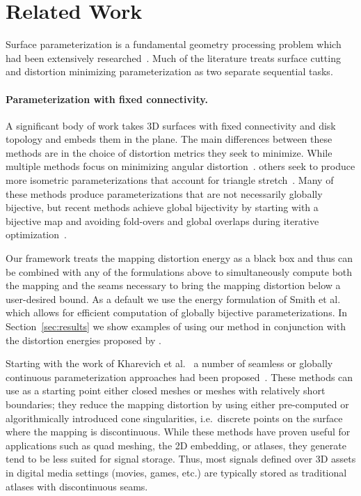 
\section{Related Work}
\label{sec:related}
Surface parameterization is a fundamental geometry processing problem which had been extensively researched~\cite{Sheffer07_ParameterizationSurvey,Hormann2008}.
Much of the literature treats  surface cutting and distortion minimizing parameterization as two separate sequential tasks. 

\paragraph{Parameterization with fixed connectivity.}
A significant body of work takes 3D surfaces with fixed connectivity and disk topology and embeds them in the plane.  The main differences between these methods are in the choice of distortion metrics they seek to minimize.  While multiple methods focus on minimizing angular distortion~\cite{Floater2003,Sheffer2005ABFPP,Levy2002,Aigerman2015,Sawhney:2017}. 
others seek to produce more isometric parameterizations that account for triangle stretch~\cite{Sander2001Texture,Hormann2000MIPS,Rabinovich2017,Zhu2017BCQN,Shtengel:GOvCM:2017,claici2017isometry}. Many of these methods produce parameterizations that are not necessarily globally bijective, but recent methods achieve global bijectivity by starting with a bijective map and avoiding fold-overs and global overlaps during iterative optimization~\cite{Smith2015Bijective,Jiang2017Simplicial}.

Our framework treats the mapping distortion energy as a black box and thus can be combined with any of the formulations above to simultaneously compute both the mapping and the seams necessary to bring the mapping distortion below a user-desired bound. As a default we use the energy formulation of Smith et al.~ which allows for efficient computation of globally bijective parameterizations.  
In Section~\ref{sec:results} we show examples of using our method in conjunction with the distortion energies proposed by .
%
 

Starting with the work of Kharevich et al.~ a number of seamless or globally continuous parameterization approaches had been proposed~\cite{pgp,others}. These methods can use as a starting point either closed meshes or meshes with relatively short boundaries; they reduce the mapping distortion by using either pre-computed or algorithmically introduced cone singularities, i.e.\ discrete points on the surface where the mapping is discontinuous. While these methods have proven useful for applications such as quad meshing, the 2D embedding, or atlases, they generate tend to be less suited for signal storage. Thus, most signals defined over 3D assets in digital media settings (movies, games, etc.) are typically stored as traditional atlases with discontinuous seams.  

